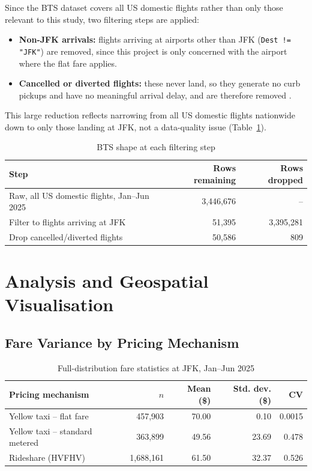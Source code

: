 \documentclass[11pt]{article}
\begin{document}
Since the BTS dataset covers all US domestic flights rather than only those relevant to
this study, two filtering steps are applied:

\begin{itemize}
  \item \textbf{Non-JFK arrivals:} flights arriving at airports other than JFK
    (\texttt{Dest != "JFK"}) are removed, since this project is only concerned with the
    airport where the flat fare applies.
  \item \textbf{Cancelled or diverted flights:} these never land, so they generate no
    curb pickups and have no meaningful arrival delay, and are therefore removed
    \citep{bts-ontime}.
\end{itemize}

This large reduction reflects narrowing from all US domestic flights nationwide down to
only those landing at JFK, not a data-quality issue (Table~\ref{tab:bts-shape}).

\begin{table}[h]
\centering
\caption{BTS shape at each filtering step}
\label{tab:bts-shape}
\small
\begin{tabular}{lrr}
\toprule
Step & Rows remaining & Rows dropped \\
\midrule
Raw, all US domestic flights, Jan--Jun 2025 & 3,446,676 & -- \\
Filter to flights arriving at JFK & 51,395 & 3,395,281 \\
Drop cancelled/diverted flights & 50,586 & 809 \\
\bottomrule
\end{tabular}
\end{table}

\FloatBarrier

\section{Analysis and Geospatial Visualisation}

\subsection{Fare Variance by Pricing Mechanism}

\begin{table}[h]
\centering
\caption{Full-distribution fare statistics at JFK, Jan--Jun 2025}
\label{tab:fare-stats}
\small
\begin{tabular}{lrrrr}
\toprule
Pricing mechanism & $n$ & Mean (\$) & Std. dev. (\$) & CV \\
\midrule
Yellow taxi -- flat fare & 457,903 & 70.00 & 0.10 & 0.0015 \\
Yellow taxi -- standard metered & 363,899 & 49.56 & 23.69 & 0.478 \\
Rideshare (HVFHV) & 1,688,161 & 61.50 & 32.37 & 0.526 \\
\bottomrule
\end{tabular}
\end{table}
\end{document}
